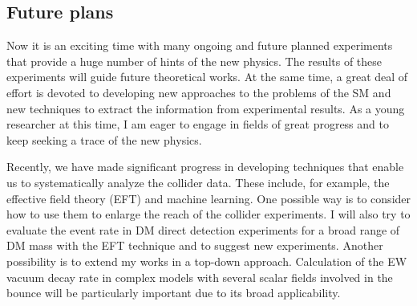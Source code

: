 \documentclass[12pt,notitlepage]{article}
\begin{document}
\vspace*{-2mm}
\subsection*{Future plans}


Now it is an exciting time with many ongoing and future planned experiments that provide a huge number of hints of the new physics.
The results of these experiments will guide future theoretical works.
At the same time, a great deal of effort is devoted to developing new approaches to the problems of the SM and new techniques to extract the information from experimental results.
As a young researcher at this time, I am eager to engage in fields of great progress and to keep seeking a trace of the new physics.

Recently, we have made significant progress in developing techniques that enable us to systematically analyze the collider data.
These include, for example, the effective field theory (EFT) and machine learning.
One possible way is to consider how to use them to enlarge the reach of the collider experiments.
I will also try to evaluate the event rate in DM direct detection experiments for a broad range of DM mass with the EFT technique and to suggest new experiments.
Another possibility is to extend my works in a top-down approach.
Calculation of the EW vacuum decay rate in complex models with several scalar fields involved in the bounce will be particularly important due to its broad applicability.
\end{document}
